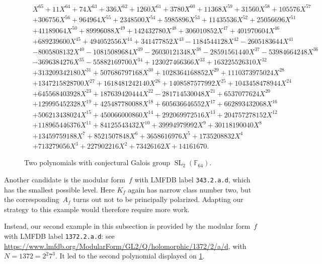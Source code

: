 \documentclass[12pt,oneside]{amsart}
\numberwithin{equation}{section}
\theoremstyle{definition}
\newcommand{\F}{\mathbb{F}}
\DeclareMathOperator{\SL}{SL}
\begin{document}
\begin{figure}
\begin{align*}
    &X^{65} + 11X^{64} + 74X^{63} + 336X^{62} + 1260X^{61} + 3780X^{60} + 11368X^{59} + 31560X^{58} + 105576X^{57} \\ &+ 306756X^{56} + 964964X^{55} + 2348500X^{54} + 5985896X^{53} + 11435536X^{52} + 25056696X^{51} \\ &+ 41189064X^{50} + 89996088X^{49} + 142432780X^{48} + 306010852X^{47} + 401970604X^{46} \\ & + 689239600X^{45}+ 494052556X^{44} + 341477852X^{43} - 1184544128X^{42} - 2605183644X^{41} \\ &- 8005808132X^{40} - 10815089684X^{39} - 26030121348X^{38} - 28591561440X^{37} - 53984664248X^{36}\\ & - 3696384276X^{35} - 55882169700X^{34} + 123027466366X^{33} + 163225526310X^{32}\\ & + 313209342180X^{31} + 507686797168X^{30} + 1028364168852X^{29} + 1110373975024X^{28}\\ & + 1347215828700X^{27} + 1618481242140X^{26} + 1408587577992X^{25} + 1043458478944X^{24}\\ & + 645568403928X^{23} + 187639420444X^{22} - 281714530048X^{21} + 6537077624X^{20}\\ & + 129995452328X^{19} + 425487780088X^{18} + 605636646552X^{17} + 662893432068X^{16}\\ & + 506213438024X^{15} + 450066000860X^{14} + 292069972516X^{13} + 204757278152X^{12}\\ & + 118965446376X^{11} + 84125543432X^{10} + 39994979992X^9 + 30118190040X^8\\ & + 13459759188X^7 + 8521507848X^6 + 3658616976X^5 + 1735208832X^4\\ & + 713279056X^3 + 227902216X^2 + 73426162X + 14161670.
  \end{align*}
  \caption{Two polynomials with conjectural Galois group $\SL_2(\F_{64})$.}
  \label{fig:minpoly-2}
\end{figure}


Another candidate is the modular form~$f$ with LMFDB label \texttt{343.2.a.d},
which has the smallest possible level. Here $K_f$ again has narrow class number
two, but the corresponding~$A_f$ turns out not to be principally
polarized. Adapting our strategy to this example would therefore require more
work.


Instead, our second example in this subsection is provided by the modular
form~$f$ with LMFDB label \texttt{1372.2.a.d}: see
\url{https://www.lmfdb.org/ModularForm/GL2/Q/holomorphic/1372/2/a/d},
with~$N = 1372 = 2^2 7^3$. It led to the second polynomial displayed on
\cref{fig:minpoly-2}.
\end{document}
